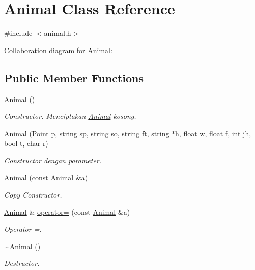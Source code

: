 \hypertarget{classAnimal}{}\section{Animal Class Reference}
\label{classAnimal}


{\ttfamily \#include $<$animal.\+h$>$}



Collaboration diagram for Animal\+:
\subsection*{Public Member Functions}
\begin{DoxyCompactItemize}
\item 
\hyperlink{classAnimal_a1e726a49ec952443190ac62dad22353c}{Animal} ()
\begin{DoxyCompactList}\small\item\em Constructor. Menciptakan \hyperlink{classAnimal}{Animal} kosong. \end{DoxyCompactList}\item 
\hyperlink{classAnimal_a7aeb08a1d5399b8719949bc32e41be24}{Animal} (\hyperlink{classPoint}{Point} p, string sp, string so, string ft, string $\ast$h, float w, float f, int jh, bool t, char r)
\begin{DoxyCompactList}\small\item\em Constructor dengan parameter. \end{DoxyCompactList}\item 
\hyperlink{classAnimal_a90c725c5298037a1aa5448d4356b04db}{Animal} (const \hyperlink{classAnimal}{Animal} \&a)
\begin{DoxyCompactList}\small\item\em Copy Constructor. \end{DoxyCompactList}\item 
\hyperlink{classAnimal}{Animal} \& \hyperlink{classAnimal_ab9ea212f94920608ab2dd072fcaf26c1}{operator=} (const \hyperlink{classAnimal}{Animal} \&a)
\begin{DoxyCompactList}\small\item\em Operator =. \end{DoxyCompactList}\item 
\hyperlink{classAnimal_a476af25adde5f0dfa688129c8f86fa5c}{$\sim$\+Animal} ()
\begin{DoxyCompactList}\small\item\em Destructor. \end{DoxyCompactList}\item 

\end{DoxyCompactItemize}
